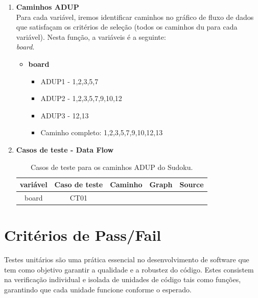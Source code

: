 \documentclass{article}
\begin{document}
\begin{itemize}
\begin{enumerate}
\begin{figure}[H]
    \end{figure}
    \item \textbf{Caminhos ADUP}\\
    
    Para cada variável, iremos identificar caminhos no gráfico de fluxo de dados que satisfaçam os critérios de seleção (todos os caminhos du
para cada variável).
    Nesta função, a variáveis é a seguinte:\\
    \textit{board}.
    \begin{itemize}
        \item \textbf{board}
        \begin{itemize}
            \item ADUP1 - 1,2,3,5,7
            \item ADUP2 - 1,2,3,5,7,9,10,12
            \item ADUP3 - 12,13
            \item Caminho completo: 1,2,3,5,7,9,10,12,13
        \end{itemize}
    \end{itemize}
    \item \textbf{Casos de teste - Data Flow}
    \begin{table}[H]
        \centering
        \begin{tabular}{|c|c|c|p{4cm}|c|} %
        \hline
        \textbf{variável} & \textbf{Caso de teste} & \textbf{Caminho} & \textbf{Graph} & \textbf{Source} \\ \hline
        board & CT01 &  &  &   \\ 
        \hline
    \end{tabular}
    \caption{Casos de teste para os caminhos ADUP do Sudoku.}
    \label{tab:tabela_exemplo}
\end{table}
    
    \end{enumerate}

    
\end{itemize}



\section{Critérios de Pass/Fail}

\quad Testes unitários são uma prática essencial no desenvolvimento de software que tem como objetivo garantir a qualidade e a robustez do código. Estes consistem na verificação individual e isolada de unidades de código tais como funções, garantindo que cada unidade funcione conforme o esperado.
\end{document}
